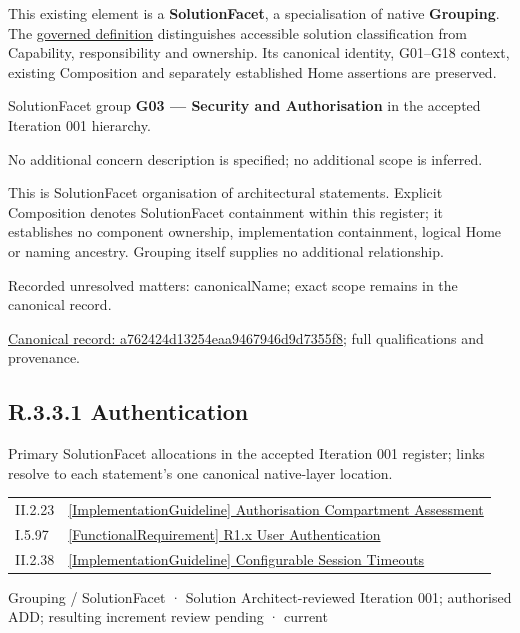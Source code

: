 This existing element is a \textbf{SolutionFacet}, a specialisation of native
\textbf{Grouping}. The \href{\detokenize{../../../../../../../governance/continuum-representation.md#solutionfacet-classification--1119-candidate}}{governed definition}
distinguishes accessible solution classification from Capability, responsibility
and ownership. Its canonical identity, G01–G18 context, existing Composition
and separately established Home assertions are preserved.



SolutionFacet group \textbf{G03 — Security and Authorisation} in the accepted Iteration 001 hierarchy.



No additional concern description is specified; no additional scope is inferred.



This is SolutionFacet organisation of architectural statements. Explicit Composition denotes SolutionFacet containment within this register; it establishes no component ownership, implementation containment, logical Home or naming ancestry. Grouping itself supplies no additional relationship.


{\small Recorded unresolved matters: canonicalName; exact scope remains in the canonical record.}\par
{\footnotesize \href{../../../../../../../continuum/grouping/a762424d13254eaa9467946d9d7355f8.md}{Canonical record: a762424d13254eaa9467946d9d7355f8}; full qualifications and provenance.}\par
\subsection*{R.3.3.1 Authentication}
\label{navigation:R.3.3.1}

Primary SolutionFacet allocations in the accepted Iteration 001 register; links resolve to each statement’s one canonical native-layer location.\par
\begin{longtable}{p{.22\linewidth}p{.73\linewidth}}
II.2.23 & \hyperref[element:a471a150c7d24210a991e96ed82e27a2]{[ImplementationGuideline] Authorisation Compartment Assessment} \\
I.5.97 & \hyperref[element:9683182663cd40428d806ed2d8685511]{[FunctionalRequirement] R1.x User Authentication} \\
II.2.38 & \hyperref[element:886896239b2e40b0b3bda53e922a2ab6]{[ImplementationGuideline] Configurable Session Timeouts} \\
\end{longtable}
\label{element:f29ffa95c89d470b8a32e1369696327f}
{\small Grouping / SolutionFacet · Solution Architect-reviewed Iteration 001; authorised ADD; resulting increment review pending · current}\par

